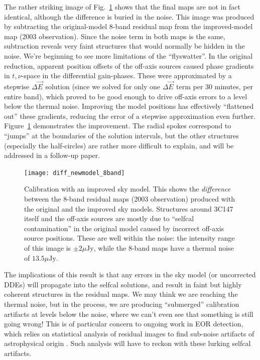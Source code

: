 \documentclass[]{aa}
\newcommand{\jones}[2]{\vec {#1}_{#2}}
\begin{document}
The rather striking image of Fig.~\ref{fig:diff-newmodel} shows that the final maps are not in fact identical, although the difference is buried in the noise. This image was produced by subtracting the original-model 8-band residual map from the improved-model map (2003 observation). 
Since the noise term in both maps is the same, subtraction reveals very faint structures that would normally be hidden in the noise. We're beginning to see more limitations of the ``flyswatter''. In the original reduction, apparent position offsets of the off-axis sources caused phase gradients in $t,\nu$-space in the differential gain-phases. These were approximated by a stepwise $\Delta\jones{E}{}$ solution (since we solved for only one $\Delta\jones{E}{}$ term per 30 minutes, per entire band), which proved to be good enough to drive off-axis errors to a level below the thermal noise. Improving the model positions has effectively ``flattened out'' these gradients, reducing the error of a stepwise approximation even further. Figure~\ref{fig:diff-newmodel} demonstrates the improvement. The radial spokes correspond to ``jumps'' at the boundaries of the solution intervals, but the other structures (especially the half-circles) are rather more difficult to explain, and will be addressed in a follow-up paper.

\begin{figure}
\begin{centering}
\texttt{[image: diff\_newmodel\_8band]}%
\end{centering}
\caption{\label{fig:diff-newmodel}Calibration with an improved sky model. This shows the \emph{difference} between the 8-band residual maps (2003 observation) produced with the original and the improved sky models. Structures around 3C147 itself and the off-axis sources are mostly due to ``selfcal contamination'' in the original model caused by incorrect off-axis source positions. These are well within the noise: the intensity range of this image is $\pm2 \mu\mathrm{Jy}$, while the 8-band maps have a thermal noise of $13.5 \mu\mathrm{Jy}$.}
\end{figure}

The implications of this result is that any errors in the sky model (or uncorrected DDEs) will propagate into the selfcal solutions, and result in faint but highly coherent structures in the residual maps. We may think we are reaching the thermal noise, but in the process, we are producing ``submerged'' calibration artifacts at levels below the noise, where we can't even see that something is still going wrong! This is of particular concern to ongoing work in EOR detection, which relies on statistical analysis of residual images to find sub-noise artifacts of astrophysical origin \citep{EOR-LOFAR,EOR-MWA}. Such analysis will have to reckon with these lurking selfcal artifacts.
\end{document}
